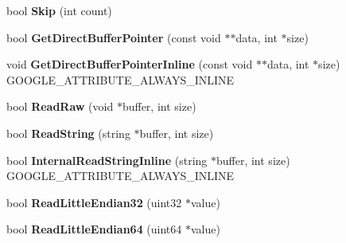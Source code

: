 \begin{DoxyCompactItemize}
\mbox{\label{classgoogle_1_1protobuf_1_1io_1_1CodedInputStream_af17ae94842f161ed70958cdd344bbf35}} 
bool {\bfseries Skip} (int count)
\item 
\mbox{\label{classgoogle_1_1protobuf_1_1io_1_1CodedInputStream_ae7a24a346936a019207b04227e3b21cd}} 
bool {\bfseries Get\+Direct\+Buffer\+Pointer} (const void $\ast$$\ast$data, int $\ast$size)
\item 
\mbox{\label{classgoogle_1_1protobuf_1_1io_1_1CodedInputStream_a5db6743aed84ac18571a2f22eea383db}} 
void {\bfseries Get\+Direct\+Buffer\+Pointer\+Inline} (const void $\ast$$\ast$data, int $\ast$size) G\+O\+O\+G\+L\+E\+\_\+\+A\+T\+T\+R\+I\+B\+U\+T\+E\+\_\+\+A\+L\+W\+A\+Y\+S\+\_\+\+I\+N\+L\+I\+NE
\item 
\mbox{\label{classgoogle_1_1protobuf_1_1io_1_1CodedInputStream_a9bcd442a3547ff1252593eed6ce6d9da}} 
bool {\bfseries Read\+Raw} (void $\ast$buffer, int size)
\item 
\mbox{\label{classgoogle_1_1protobuf_1_1io_1_1CodedInputStream_a40bf2947a82b34bbd851eda2f5a3f1b8}} 
bool {\bfseries Read\+String} (string $\ast$buffer, int size)
\item 
\mbox{\label{classgoogle_1_1protobuf_1_1io_1_1CodedInputStream_a7b555fa9551b9fc5d46416cb78d0c38d}} 
bool {\bfseries Internal\+Read\+String\+Inline} (string $\ast$buffer, int size) G\+O\+O\+G\+L\+E\+\_\+\+A\+T\+T\+R\+I\+B\+U\+T\+E\+\_\+\+A\+L\+W\+A\+Y\+S\+\_\+\+I\+N\+L\+I\+NE
\item 
\mbox{\label{classgoogle_1_1protobuf_1_1io_1_1CodedInputStream_a3104dc45643c6f4c90db0323b5b719b8}} 
bool {\bfseries Read\+Little\+Endian32} (uint32 $\ast$value)
\item 
\mbox{\label{classgoogle_1_1protobuf_1_1io_1_1CodedInputStream_a13c3d476d6b5c268156f4deda61cbd25}} 
bool {\bfseries Read\+Little\+Endian64} (uint64 $\ast$value)

\end{DoxyCompactItemize}
